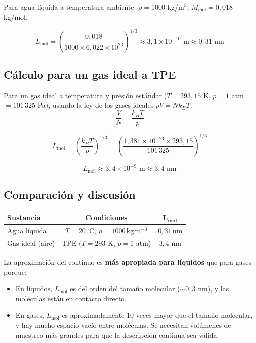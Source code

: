 Para agua líquida a temperatura ambiente: $\rho = 1000$ kg/m$^3$, $M_{\text{mol}} = 0{,}018$ kg/mol.

$$
L_{\text{mol}} = \left(\frac{0{,}018}{1000 \times 6{,}022 \times 10^{23}}\right)^{1/3} \approx 3{,}1 \times 10^{-10} \text{ m} \approx 0{,}31 \text{ nm}
$$

\subsection{Cálculo para un gas ideal a TPE}

Para un gas ideal a temperatura y presión estándar ($T = 293{,}15$ K, $p = 1$ atm $= 101\,325$ Pa), usando la ley de los gases ideales $pV = Nk_B T$:
$$
\frac{V}{N} = \frac{k_B T}{p}
$$

$$
L_{\text{mol}} = \left(\frac{k_B T}{p}\right)^{1/3} = \left(\frac{1{,}381 \times 10^{-23} \times 293{,}15}{101\,325}\right)^{1/3}
$$

$$
\boxed{L_{\text{mol}} \approx 3{,}4 \times 10^{-9} \text{ m} \approx 3{,}4 \text{ nm}}
$$

\subsection{Comparación y discusión}

\begin{center}
\begin{tabular}{lcc}
\toprule
\textbf{Sustancia} & \textbf{Condiciones} & $\boldsymbol{L_{\text{mol}}}$ \\
\midrule
Agua líquida & $T=20\,^{\circ}\mathrm{C}$, $\rho=1000\,\mathrm{kg\,m^{-3}}$ & $0{,}31\,\mathrm{nm}$ \\
Gas ideal (aire) & TPE ($T = 293$ K, $p = 1$ atm) & $3{,}4$ nm \\
\bottomrule
\end{tabular}
\end{center}

La aproximación del continuo es \textbf{más apropiada para líquidos} que para gases porque:
\begin{itemize}
    \item En líquidos, $L_{\text{mol}}$ es del orden del tamaño molecular ($\sim 0{,}3$ nm), y las moléculas están en contacto directo.
    \item En gases, $L_{\text{mol}}$ es aproximadamente 10 veces mayor que el tamaño molecular, y hay mucho espacio vacío entre moléculas. Se necesitan volúmenes de muestreo más grandes para que la descripción continua sea válida.
\end{itemize}

